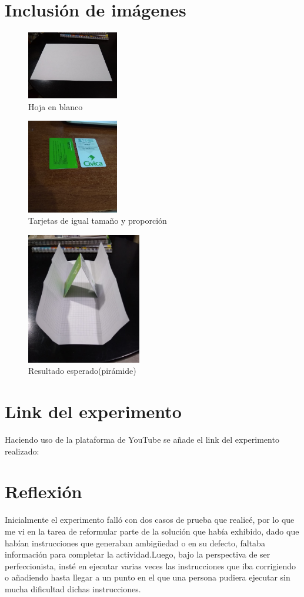 \documentclass{article}
\begin{document}
\section{Inclusión de imágenes} \label{imagenes}
\begin{figure}[h]
\includegraphics[width=4cm]{Hoja.jpeg}
\centering
\caption{Hoja en blanco}
\label{fig:Hoja}
\end{figure}
\begin{figure}[h]
\includegraphics[width=4cm]{Tarjetas.jpeg}
\centering
\caption{Tarjetas de igual tamaño y proporción}
\label{fig:Tarjetas}
\end{figure}
\begin{figure}[h]
\includegraphics[width=5cm]{Piramide.jpeg}
\centering
\caption{Resultado esperado(pirámide)}
\label{fig:Piramide}
\end{figure}

\section{Link del experimento}
Haciendo uso de la plataforma de YouTube se añade el link del experimento realizado:

\newpage
\section{Reflexión}
Inicialmente el experimento falló con dos casos de prueba que realicé, por lo que me vi en la tarea de reformular parte de la solución que había exhibido, dado que habían instrucciones que generaban ambigüedad o en su defecto, faltaba información para completar la actividad.Luego, bajo la perspectiva de ser perfeccionista, insté en ejecutar varias veces las instrucciones que iba corrigiendo o añadiendo hasta llegar a un punto en el que una persona pudiera ejecutar sin mucha dificultad dichas instrucciones.
\end{document}
